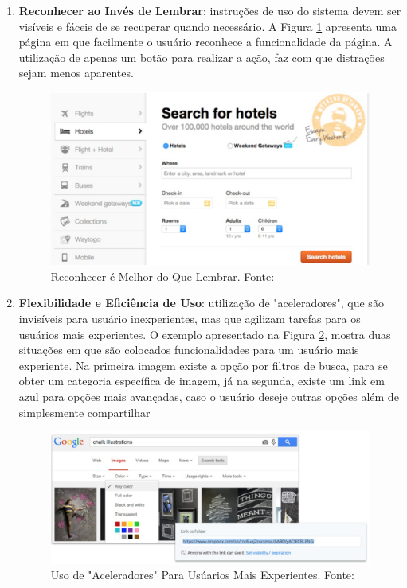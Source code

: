 \begin{enumerate}
\item\textbf{Reconhecer ao Invés de Lembrar}: instruções de uso do sistema devem ser visíveis e fáceis de se recuperar quando necessário. A Figura \ref{img:princ6} apresenta uma página em que facilmente o usuário reconhece a funcionalidade da página. A utilização de apenas um botão para realizar a ação, faz com que distrações sejam menos aparentes.
 \graphicspath{{figuras/}}
  \begin{figure}[h!]
  \centering
  \includegraphics[scale=0.50]{princ_6.png}
  \caption{Reconhecer é Melhor do Que Lembrar. Fonte: \cite{pres_usabilidade}}
  \label{img:princ6}
  \end{figure}
  
  \item\textbf{Flexibilidade e Eficiência de Uso}: utilização de "aceleradores", que são invisíveis para usuário inexperientes, mas que agilizam tarefas para os usuários mais experientes. O exemplo apresentado na Figura \ref{img:princ7}, mostra duas situações em que são colocados funcionalidades para um usuário mais experiente. Na primeira imagem existe a opção por filtros de busca, para se obter um categoria específica de imagem, já na segunda, existe um link em azul para opções mais avançadas, caso o usuário deseje outras opções além de simplesmente compartilhar
   \graphicspath{{figuras/}}
  \begin{figure}[h!]
  \centering
  \includegraphics[scale=0.50]{princ_7.png}
  \caption{Uso de "Aceleradores" Para Usúarios Mais Experientes. Fonte: \cite{pres_usabilidade}}
  \label{img:princ7}
  \end{figure}


\end{enumerate}
